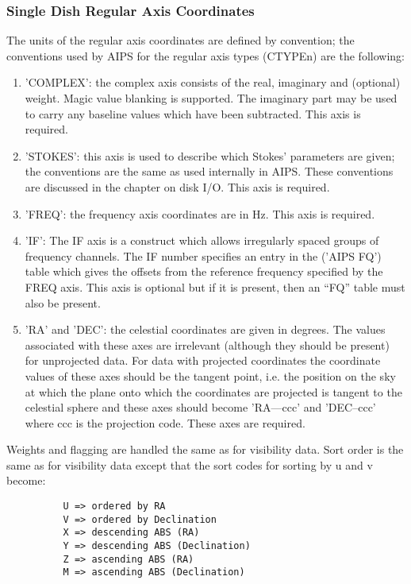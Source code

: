 \subsubsection{Single Dish Regular Axis Coordinates }
The units of the regular axis coordinates are defined by convention;
the conventions used by AIPS for the regular axis types (CTYPEn)
are the following:
\begin{enumerate} %
\item 'COMPLEX': the complex axis consists of the real, imaginary and
(optional) weight.  Magic value blanking is supported.  The imaginary
part may be used to carry any baseline values which have been
subtracted.  This axis is required.
\item 'STOKES': this axis is used to describe which Stokes' parameters are
given; the conventions are the same as used internally in AIPS.  These
conventions are discussed in the chapter on disk I/O.  This axis is
required.
\item 'FREQ': the frequency axis coordinates are in Hz.  This axis is required.
\item 'IF': The IF axis is a construct which allows irregularly spaced groups
of frequency channels.  The IF number specifies an entry in the ('AIPS
FQ') table which gives the offsets from the
reference frequency specified by the FREQ axis.  This axis is optional
but if it is present, then an ``FQ'' table must also be present.
\item 'RA' and 'DEC': the celestial coordinates are given in degrees.  The
values associated with these axes are irrelevant (although they should
be present) for unprojected data.  For data with projected coordinates
the coordinate values of these axes should be the tangent point, i.e.
the position on the sky at which the plane onto which the coordinates
are projected is tangent to the celestial sphere and these axes should
become 'RA---ccc' and 'DEC--ccc' where ccc is the projection code.
These axes are required.

\end{enumerate} %
     Weights and flagging are handled the same as for visibility data.
Sort order is the same as for visibility data except that the sort
codes for sorting by u and v become:
\begin{verbatim}
          U => ordered by RA
          V => ordered by Declination
          X => descending ABS (RA)
          Y => descending ABS (Declination)
          Z => ascending ABS (RA)
          M => ascending ABS (Declination)

\end{verbatim}
